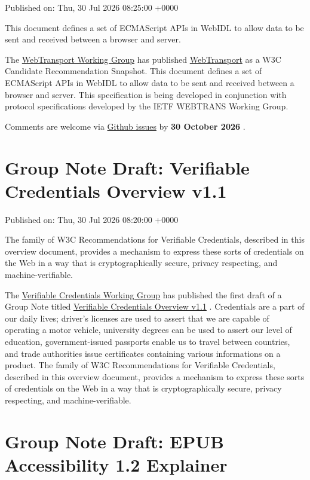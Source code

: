\documentclass[11pt,a4paper]{article}
\begin{document}
Published on: Thu, 30 Jul 2026 08:25:00 +0000

This document defines a set of ECMAScript APIs in WebIDL to allow data to be sent and received between a browser and server.

The \href{https://www.w3.org/groups/wg/webtransport/}{WebTransport Working Group} has published \href{https://www.w3.org/TR/2026/CR-webtransport-20260730/}{WebTransport} as a W3C Candidate Recommendation Snapshot. This document defines a set of ECMAScript APIs in WebIDL to allow data to be sent and received between a browser and server. This specification is being developed in conjunction with protocol specifications developed by the IETF WEBTRANS Working Group.

Comments are welcome via \href{https://github.com/w3c/webtransport/issues/}{Github issues} by \textbf{30 October 2026} .

\section{Group Note Draft: Verifiable Credentials Overview v1.1}

Published on: Thu, 30 Jul 2026 08:20:00 +0000

The family of W3C Recommendations for Verifiable Credentials, described in this overview document, provides a mechanism to express these sorts of credentials on the Web in a way that is cryptographically secure, privacy respecting, and machine-verifiable.

The \href{https://www.w3.org/groups/wg/vc/}{Verifiable Credentials Working Group} has published the first draft of a Group Note titled \href{https://www.w3.org/TR/2026/DNOTE-vc-overview-1.1-20260730/}{Verifiable Credentials Overview v1.1} . Credentials are a part of our daily lives; driver's licenses are used to assert that we are capable of operating a motor vehicle, university degrees can be used to assert our level of education, government-issued passports enable us to travel between countries, and trade authorities issue certificates containing various informations on a product. The family of W3C Recommendations for Verifiable Credentials, described in this overview document, provides a mechanism to express these sorts of credentials on the Web in a way that is cryptographically secure, privacy respecting, and machine-verifiable.

\section{Group Note Draft: EPUB Accessibility 1.2 Explainer}
\end{document}
